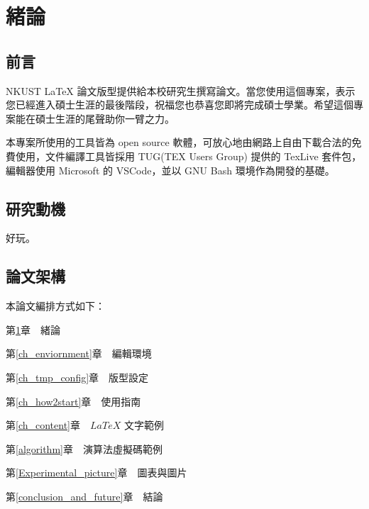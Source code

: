 
\chapter{緒論}\label{introduction}


\section{前言}\label{preface}

NKUST LaTeX 論文版型提供給本校研究生撰寫論文。當您使用這個專案，表示您已經進入碩士生涯的最後階段，祝福您也恭喜您即將完成碩士學業。希望這個專案能在碩士生涯的尾聲助你一臂之力。

本專案所使用的工具皆為 open source 軟體，可放心地由網路上自由下載合法的免費使用，文件編譯工具皆採用 TUG(TEX Users Group) 提供的 TexLive 套件包，編輯器使用 Microsoft 的 VSCode，並以 GNU Bash 環境作為開發的基礎。

\newpage

\section{研究動機}\label{motive}

好玩。


\section{論文架構}\label{thesis_arch}
\n 本論文編排方式如下：

第\ref{introduction}章　緒論

第\ref{ch_enviornment}章　編輯環境

第\ref{ch_tmp_config}章　版型設定

第\ref{ch_how2start}章　使用指南

第\ref{ch_content}章　$LaTeX$ 文字範例

第\ref{algorithm}章　演算法虛擬碼範例

第\ref{Experimental_picture}章　圖表與圖片

第\ref{conclusion_and_future}章　結論
